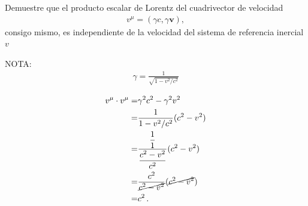 \documentclass[12pt, a4paper]{article}
\begin{document}
\begin{exercise}[ID=cuadrivector, subtitle={Norma del cuadrivector velocidad}, tags={banco}]
Demuestre que el producto escalar de Lorentz del cuadrivector de velocidad 
\begin{align}
    v^\mu = \left(\gamma c, \gamma \boldsymbol{v}\right),
\end{align}
consigo mismo, es independiente de la velocidad del sistema de referencia inercial $v$

NOTA:
\begin{align}
\gamma = \frac{1}{\sqrt{1-v^2/c^2}}    
\end{align}
\end{exercise}
\begin{solution}
\begin{align}
        v^\mu\cdot v^\mu =& \gamma^2 c^2 -\gamma^2 v^2 \\
                    =& \frac{1}{1-v^2/c^2}(c^2-v^2)\\
                    =&\frac{\dfrac{1}{1}}{\dfrac{c^2-v^2}{c^2}}(c^2-v^2)\\
                    =&\frac{c^2}{\cancel{c^2-v^2}}(\cancel{c^2-v^2})\\
                    =& c^2\,.
    \end{align}
\end{solution}
\end{document}
